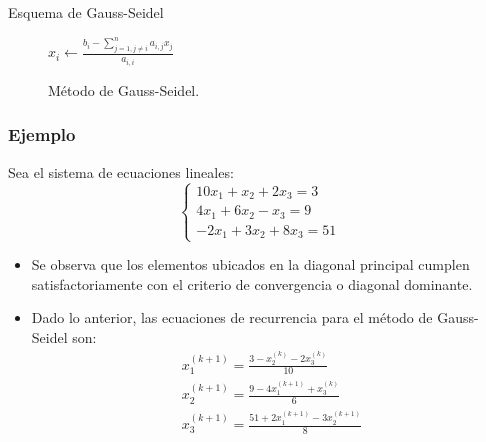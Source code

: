 \documentclass[10pt]{beamer}
\begin{document}
  \begin{frame}{Esquema de Gauss-Seidel}
    \begin{figure}[h]                  
      \begin{algorithm}[H]       
       \caption{M\'etodo de Gauss-Seidel.}
       {
        {
          $x_i \leftarrow \displaystyle\frac{b_i-\displaystyle\sum_{j=1,j\neq i}^na_{i,j}x_j}{a_{i,i}}$\\
        }
       }      
      \end{algorithm}
      \end{figure}
  \end{frame}
  \begin{frame}
    \frametitle{Ejemplo}
    Sea el sistema de ecuaciones lineales:
    $$
    \left\{\begin{array}{c}
            10x_1 + x_2 + 2x_3 = 3\\
            4x_1 + 6x_2 - x_3 = 9\\
            -2x_1 + 3x_2 + 8x_3 = 51
           \end{array}
    \right.
    $$
    \begin{itemize}
    \item<2-> Se observa que los elementos ubicados en la diagonal principal cumplen satisfactoriamente con el criterio de convergencia o diagonal dominante.
    \item<3->Dado lo anterior, las ecuaciones de recurrencia para el m\'etodo de Gauss-Seidel son:
    $$
    \begin{array}{l}
    x_1^{(k+1)} = \displaystyle\frac{3-x_2^{(k)}-2x_3^{(k)}}{10}\\[5pt]
    x_2^{(k+1)} = \displaystyle\frac{9-4x_1^{(k+1)}+x_3^{(k)}}{6}\\[5pt]
    x_3^{(k+1)} = \displaystyle\frac{51+2x_1^{(k+1)}-3x_2^{(k+1)}}{8}
    \end{array}
    $$
    \end{itemize}
    \end{frame}
\end{document}
